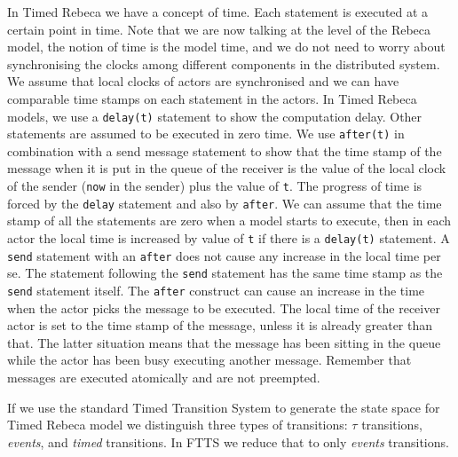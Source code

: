 In Timed Rebeca we have a concept of time. Each statement is executed at a certain point in time. Note that we are now talking at the level of the Rebeca model, the notion of time is the model time, and we do not need to worry about synchronising the clocks among different components in the distributed system. We assume that local clocks of actors are synchronised and we can have comparable time stamps on each statement in the actors.
%
In Timed Rebeca models, we use a \texttt{delay(t)} statement to show the computation delay. Other statements are assumed to be executed in zero time. We use  \texttt{after(t)} in combination with a send message statement to show that the time stamp of the message when it is put in the queue of the receiver is the value of the local clock of the sender (\texttt{now} in the sender) plus the value of \texttt{t}.
The progress of time is forced by the \texttt{delay} statement and also by \texttt{after}. 
We can assume that the time stamp of all the statements are zero when a model starts to execute, then in each actor the local time is increased by value of \texttt{t} if there is a \texttt{delay(t)} statement.
A \texttt{send} statement with an  \texttt{after} does not cause any increase in the local time per se. The statement following the \texttt{send} statement has the same time stamp as the \texttt{send} statement itself.
The \texttt{after} construct can cause an increase in the time when the actor picks the message to be executed. The local time of the receiver actor is set to the time stamp of the message, unless it is already greater than that.
The latter situation means that the message has been sitting in the queue while the actor has been busy executing another message. Remember that messages are executed atomically and are not preempted.


If we use the standard Timed Transition System to generate the state space for Timed Rebeca model we distinguish three types of transitions: $\tau$ transitions, \textit{events}, and \textit{timed} transitions.
In FTTS we reduce that to only \textit{events} transitions.
%





